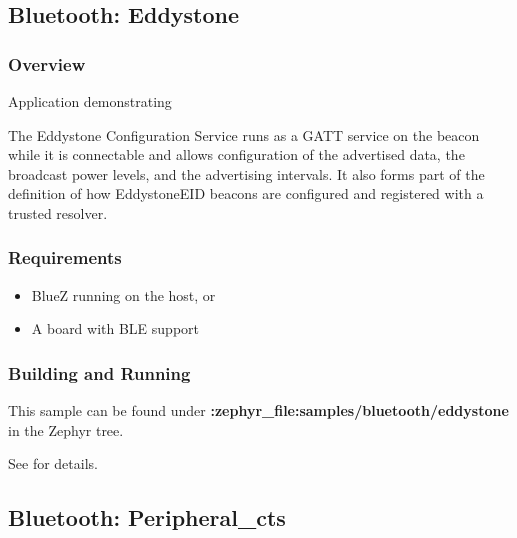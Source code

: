 \documentclass[letterpaper,10pt,english]{sphinxmanual}
\begin{document}
\subsection{Bluetooth: Eddystone}
\label{\detokenize{samples/bluetooth/eddystone/README:bluetooth-eddystone}}\label{\detokenize{samples/bluetooth/eddystone/README:bluetooth-eddystone-sample}}\label{\detokenize{samples/bluetooth/eddystone/README::doc}}

\subsubsection{Overview}
\label{\detokenize{samples/bluetooth/eddystone/README:overview}}
Application demonstrating 

The Eddystone Configuration Service runs as a GATT service on the beacon while
it is connectable and allows configuration of the advertised data, the
broadcast power levels, and the advertising intervals. It also forms part of
the definition of how Eddystone\sphinxhyphen{}EID beacons are configured and registered with
a trusted resolver.


\subsubsection{Requirements}
\label{\detokenize{samples/bluetooth/eddystone/README:requirements}}\begin{itemize}
\item {} 
BlueZ running on the host, or

\item {} 
A board with BLE support

\end{itemize}


\subsubsection{Building and Running}
\label{\detokenize{samples/bluetooth/eddystone/README:building-and-running}}
This sample can be found under {\color{red}\bfseries{}:zephyr\_file:\textasciigrave{}samples/bluetooth/eddystone\textasciigrave{}} in the
Zephyr tree.

See {\hyperref[\detokenize{samples/bluetooth/bluetooth:bluetooth-samples}]{}} for details.


\subsection{Bluetooth: Peripheral\_cts}
\label{\detokenize{samples/bluetooth/peripheral-cts/README:bluetooth-peripheral-cts}}\label{\detokenize{samples/bluetooth/peripheral-cts/README:ble-peripheral-cts}}\label{\detokenize{samples/bluetooth/peripheral-cts/README::doc}}
\end{document}
